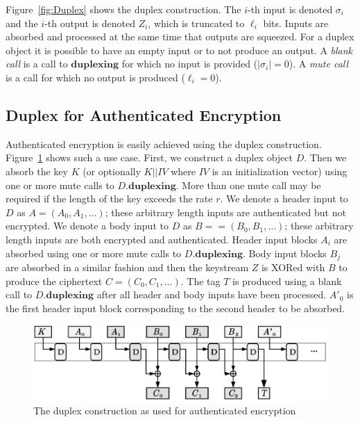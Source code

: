 Figure~\ref{fig:Duplex} shows the duplex construction.
The $i$-th input is denoted $\sigma_i$ and the $i$-th output is denoted $Z_i$, which is truncated to $\ell_i$ bits.
Inputs are absorbed and processed at the same time that outputs are squeezed.
For a duplex object it is possible to have an empty input or to not produce an output.
A \emph{blank call} is a call to $\mathbf{duplexing}$ for which no input is provided ($|\sigma_i| = 0$).
A \emph{mute call} is a call for which no output is produced ($\ell_i = 0$).

\subsection{Duplex for Authenticated Encryption}
Authenticated encryption is easily achieved using the duplex construction.
Figure~\ref{fig:DuplexAE_Expanded} shows such a use case.
First, we construct a duplex object $D$.
Then we absorb the key $K$ (or optionally $K||IV$ where $IV$ is an initialization vector) using one or more mute calls to $D.\mathbf{duplexing}$.
More than one mute call may be required if the length of the key exceeds the rate $r$.
We denote a header input to $D$ as $A = \left(A_0, A_1, \dots\right)$; these arbitrary length inputs are authenticated but not encrypted.
We denote a body input to $D$ as $B = = \left(B_0, B_1, \dots\right)$; these arbitrary length inputs are both encrypted and authenticated.
Header input blocks $A_i$ are absorbed using one or more mute calls to $D.\mathbf{duplexing}$.
Body input blocks $B_j$ are absorbed in a similar fashion and then the keystream $Z$ is XORed with $B$ to produce the ciphertext $C = \left(C_0, C_1, \dots\right)$.
The tag $T$ is produced using a blank call to $D.\mathbf{duplexing}$ after all header and body inputs have been processed.
$A'_{0}$ is the first header input block corresponding to the second header to be absorbed.

\begin{figure}
\centering
\includegraphics[width=\columnwidth]{img/DuplexAE_Expanded-BW.png}
\caption{The duplex construction as used for authenticated encryption \cite{Bertoni2010_DuplexingSlides}}
\label{fig:DuplexAE_Expanded}
\end{figure}

